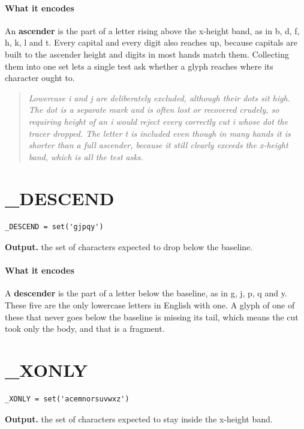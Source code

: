 \paragraph{What it encodes}
An \textbf{ascender} is the part of a letter rising above the x-height band, as in b, d, f, h, k, l and t. Every capital and every digit also reaches up, because capitals are built to the ascender height and digits in most hands match them. Collecting them into one set lets a single test ask whether a glyph reaches where its character ought to.


\begin{quote}\small\itshape Lowercase i and j are deliberately excluded, although their dots sit high. The dot is a separate mark and is often lost or recovered crudely, so requiring height of an i would reject every correctly cut i whose dot the tracer dropped. The letter t is included even though in many hands it is shorter than a full ascender, because it still clearly exceeds the x-height band, which is all the test asks.\end{quote}

\section{\_DESCEND}
\begin{lstlisting}[style=sig]
_DESCEND = set('gjpqy')
\end{lstlisting}

\noindent\textbf{Output.} the set of characters expected to drop below the baseline.


\paragraph{What it encodes}
A \textbf{descender} is the part of a letter below the baseline, as in g, j, p, q and y. These five are the only lowercase letters in English with one. A glyph of one of these that never goes below the baseline is missing its tail, which means the cut took only the body, and that is a fragment.


\section{\_XONLY}
\begin{lstlisting}[style=sig]
_XONLY = set('acemnorsuvwxz')
\end{lstlisting}

\noindent\textbf{Output.} the set of characters expected to stay inside the x-height band.


